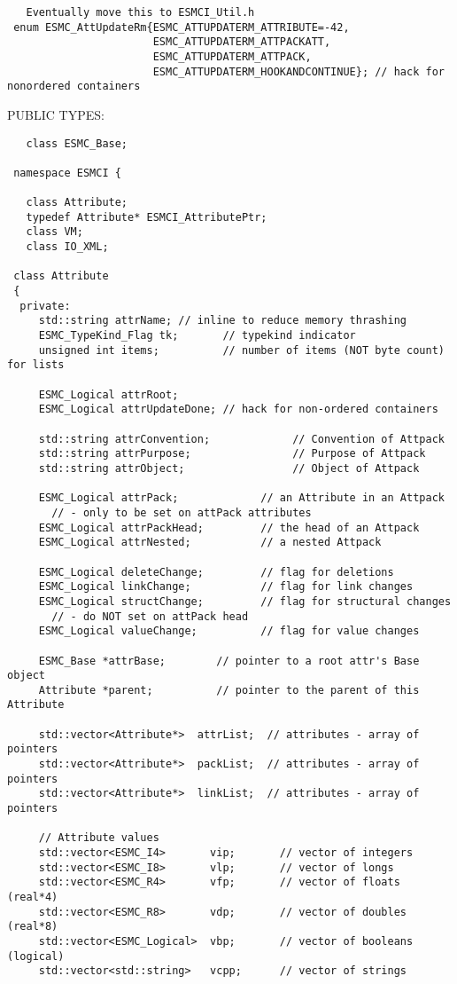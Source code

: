 \begin{verbatim} 
   Eventually move this to ESMCI_Util.h
 enum ESMC_AttUpdateRm{ESMC_ATTUPDATERM_ATTRIBUTE=-42,
                       ESMC_ATTUPDATERM_ATTPACKATT,
                       ESMC_ATTUPDATERM_ATTPACK,
                       ESMC_ATTUPDATERM_HOOKANDCONTINUE}; // hack for nonordered containers
 \end{verbatim}{\sf PUBLIC TYPES:}
\begin{verbatim}   class ESMC_Base;
 
 namespace ESMCI {
 
   class Attribute;
   typedef Attribute* ESMCI_AttributePtr;
   class VM;
   class IO_XML;
 
 class Attribute
 {
  private:
     std::string attrName; // inline to reduce memory thrashing
     ESMC_TypeKind_Flag tk;       // typekind indicator
     unsigned int items;          // number of items (NOT byte count) for lists
 
     ESMC_Logical attrRoot;
     ESMC_Logical attrUpdateDone; // hack for non-ordered containers
 
     std::string attrConvention;             // Convention of Attpack
     std::string attrPurpose;                // Purpose of Attpack
     std::string attrObject;                 // Object of Attpack
 
     ESMC_Logical attrPack;             // an Attribute in an Attpack
       // - only to be set on attPack attributes
     ESMC_Logical attrPackHead;         // the head of an Attpack
     ESMC_Logical attrNested;           // a nested Attpack
 
     ESMC_Logical deleteChange;         // flag for deletions
     ESMC_Logical linkChange;           // flag for link changes
     ESMC_Logical structChange;         // flag for structural changes
       // - do NOT set on attPack head
     ESMC_Logical valueChange;          // flag for value changes
 
     ESMC_Base *attrBase;        // pointer to a root attr's Base object
     Attribute *parent;          // pointer to the parent of this Attribute
 
     std::vector<Attribute*>  attrList;  // attributes - array of pointers
     std::vector<Attribute*>  packList;  // attributes - array of pointers
     std::vector<Attribute*>  linkList;  // attributes - array of pointers
 
     // Attribute values
     std::vector<ESMC_I4>       vip;       // vector of integers
     std::vector<ESMC_I8>       vlp;       // vector of longs
     std::vector<ESMC_R4>       vfp;       // vector of floats (real*4)
     std::vector<ESMC_R8>       vdp;       // vector of doubles (real*8)
     std::vector<ESMC_Logical>  vbp;       // vector of booleans (logical)
     std::vector<std::string>   vcpp;      // vector of strings
 

\end{verbatim}
